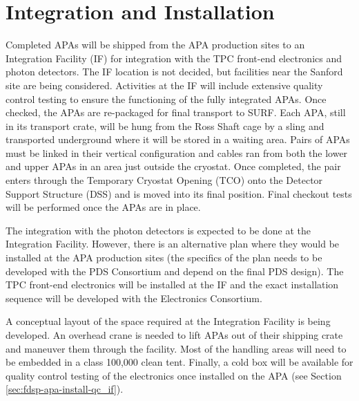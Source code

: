 \section{Integration and Installation}
\label{sec:fdsp-apa-install}

Completed APAs will be shipped from the APA production sites to an Integration Facility (IF) for integration with the TPC front-end electronics and photon detectors.  The IF location is not decided, but facilities near the Sanford site are being considered.   Activities at the IF will include extensive quality control testing to ensure the functioning of the fully integrated APAs.  Once checked, the APAs are re-packaged for final transport to SURF. Each APA, still in its transport crate, will be hung from the Ross Shaft cage by a sling and transported underground where it will be stored in a waiting area.  Pairs of APAs must be linked in their vertical configuration and cables ran from both the lower and upper APAs in an area just outside the cryostat.  Once completed, the pair enters through the Temporary Cryostat Opening (TCO) onto the Detector Support Structure (DSS) and is moved into its final position.  Final checkout tests will be performed once the APAs are in place.

The integration with the photon detectors is expected to be done at the Integration Facility. However, there is an alternative plan where they would be installed at the APA production sites (the specifics of the plan needs to be developed with the PDS Consortium and depend on the final PDS design). The TPC front-end electronics will be installed  at the IF and the exact installation sequence will be developed with the Electronics Consortium.

A conceptual layout of the space required at the Integration Facility is being developed. An overhead crane is needed to lift APAs out of their shipping crate and maneuver them through the facility.  Most of the handling areas will need to be embedded in a class 100,000 clean tent. Finally, a cold box will be available for quality control testing of the electronics once installed on the APA (see Section \ref{sec:fdsp-apa-install-qc_if}).  



